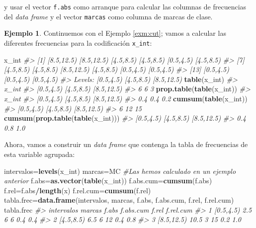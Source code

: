 \documentclass[
]{book}
\newenvironment{Shaded}{\begin{snugshade}}{\end{snugshade}}
\newcommand{\CommentTok}[1]{\textcolor[rgb]{0.56,0.35,0.01}{\textit{#1}}}
\newcommand{\KeywordTok}[1]{\textcolor[rgb]{0.13,0.29,0.53}{\textbf{#1}}}
\newcommand{\NormalTok}[1]{#1}
\newcommand{\OperatorTok}[1]{\textcolor[rgb]{0.81,0.36,0.00}{\textbf{#1}}}
\theoremstyle{definition}
\theoremstyle{definition}
\newtheorem{example}{Ejemplo}[chapter]
\theoremstyle{definition}
\theoremstyle{remark}
\begin{document}
y usar el vector \texttt{f.abs} como arranque para calcular las columnas de frecuencias del \emph{data frame} y el vector \texttt{marcas} como columna de marcas de clase.

\begin{example}
\protect\hypertarget{exm:unnamed-chunk-43}{}{\label{exm:unnamed-chunk-43} }Continuemos con el Ejemplo \ref{exm:cut}; vamos a calcular las diferentes frecuencias para la codificación \texttt{x\_int}:
\end{example}

\begin{Shaded}
\begin{Highlighting}[]
\NormalTok{x\_int}
\CommentTok{\#\textgreater{}  [1] [8.5,12.5) [8.5,12.5) [4.5,8.5)  [4.5,8.5)  [0.5,4.5)  [4.5,8.5) }
\CommentTok{\#\textgreater{}  [7] [4.5,8.5)  [4.5,8.5)  [8.5,12.5) [4.5,8.5)  [0.5,4.5)  [0.5,4.5) }
\CommentTok{\#\textgreater{} [13] [0.5,4.5)  [0.5,4.5)  [0.5,4.5) }
\CommentTok{\#\textgreater{} Levels: [0.5,4.5) [4.5,8.5) [8.5,12.5)}
\KeywordTok{table}\NormalTok{(x\_int)}
\CommentTok{\#\textgreater{} x\_int}
\CommentTok{\#\textgreater{}  [0.5,4.5)  [4.5,8.5) [8.5,12.5) }
\CommentTok{\#\textgreater{}          6          6          3}
\KeywordTok{prop.table}\NormalTok{(}\KeywordTok{table}\NormalTok{(x\_int))}
\CommentTok{\#\textgreater{} x\_int}
\CommentTok{\#\textgreater{}  [0.5,4.5)  [4.5,8.5) [8.5,12.5) }
\CommentTok{\#\textgreater{}        0.4        0.4        0.2}
\KeywordTok{cumsum}\NormalTok{(}\KeywordTok{table}\NormalTok{(x\_int))}
\CommentTok{\#\textgreater{}  [0.5,4.5)  [4.5,8.5) [8.5,12.5) }
\CommentTok{\#\textgreater{}          6         12         15}
\KeywordTok{cumsum}\NormalTok{(}\KeywordTok{prop.table}\NormalTok{(}\KeywordTok{table}\NormalTok{(x\_int)))}
\CommentTok{\#\textgreater{}  [0.5,4.5)  [4.5,8.5) [8.5,12.5) }
\CommentTok{\#\textgreater{}        0.4        0.8        1.0}
\end{Highlighting}
\end{Shaded}

Ahora, vamos a construir un \emph{data frame} que contenga la tabla de frecuencias de esta variable agrupada:

\begin{Shaded}
\begin{Highlighting}[]
\NormalTok{intervalos=}\KeywordTok{levels}\NormalTok{(x\_int)}
\NormalTok{marcas=MC  }\CommentTok{\#Las hemos calculado en un ejemplo anterior}
\NormalTok{f.abs=}\KeywordTok{as.vector}\NormalTok{(}\KeywordTok{table}\NormalTok{(x\_int))}
\NormalTok{f.abs.cum=}\KeywordTok{cumsum}\NormalTok{(f.abs)}
\NormalTok{f.rel=f.abs}\OperatorTok{/}\KeywordTok{length}\NormalTok{(x)}
\NormalTok{f.rel.cum=}\KeywordTok{cumsum}\NormalTok{(f.rel)}
\NormalTok{tabla.frec=}\KeywordTok{data.frame}\NormalTok{(intervalos, marcas, f.abs, f.abs.cum, f.rel, f.rel.cum)}
\NormalTok{tabla.frec}
\CommentTok{\#\textgreater{}   intervalos marcas f.abs f.abs.cum f.rel f.rel.cum}
\CommentTok{\#\textgreater{} 1  [0.5,4.5)    2.5     6         6   0.4       0.4}
\CommentTok{\#\textgreater{} 2  [4.5,8.5)    6.5     6        12   0.4       0.8}
\CommentTok{\#\textgreater{} 3 [8.5,12.5)   10.5     3        15   0.2       1.0}
\end{Highlighting}
\end{Shaded}
\end{document}
